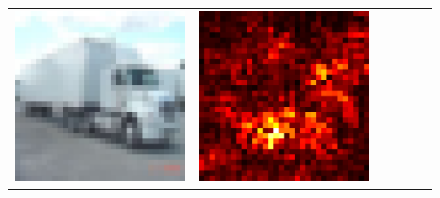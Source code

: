 \documentclass[preprint,12pt]{elsarticle}
\begin{document}
\begin{figure}[p]
\begin{tabular}{cccccc}
  \includegraphics[scale=\scale]{../visualizations/examples/cifar10/cnn/images/9.png} &
  \includegraphics[scale=\scale]{../visualizations/examples/cifar10/cnn/saliency_map/9.png} & 

\end{tabular}
\end{figure}
\end{document}
